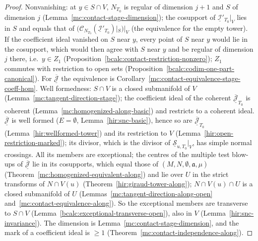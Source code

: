 \begin{proof}
\leanok
Nonvanishing: at \(y\in S\cap V\), \(N_{T_0}\) is regular of dimension \(j+1\) and \(S\) of dimension \(j\) (Lemma~\ref{mc:contact-stage-dimension}); the cosupport of
\(\underline{\mathcal I}'_{T_0}|_V\) lies in \(S\) and equals that of \((\mathcal C_{N_{T_0}}(\underline{\mathcal I}'_{T_0})|_S)|_V\) (the equivalence for the empty tower). If the coefficient ideal
vanished on \(S\) near \(y\), every point of \(S\) near \(y\) would lie in the cosupport, which would then agree with \(S\) near \(y\) and be regular of dimension
\(j\) there, i.e.\ \(y\in Z_1\) (Proposition~\ref{bcalc:contact-restriction-nonzero}); \(Z_1\) commutes with restriction to open sets (Proposition~\ref{bcalc:codim-one-part-canonical}).
For \(\overline{\underline{\mathcal J}}\) the equivalence is Corollary~\ref{mc:contact-equivalence-stage-coeff-hom}.
Well formedness: \(S\cap V\) is a closed submanifold of \(V\) (Lemma~\ref{mc:tangent-direction-stage}); the coefficient ideal of the coherent
\(\overline{\underline{\mathcal J}}_{T_0}\) is coherent (Lemma~\ref{mc:homogenized-along-basic}) and restricts to a coherent ideal. \(\overline{\underline{\mathcal J}}\) is well formed
(\(E=\emptyset\), Lemma~\ref{hir:snc-basic}), hence so are \(\overline{\underline{\mathcal J}}_{T_0}\) (Lemma~\ref{hir:wellformed-tower}) and its restriction to \(V\)
(Lemma~\ref{hir:open-restriction-marked}); its divisor, which is the divisor of \(\underline{\mathcal S}_{u,T_0}|_V\), has simple normal crossings. All its members are
exceptional; the centres of the multiple test blow-ups of \(\overline{\underline{\mathcal J}}\) lie in its cosupports, which equal those of \((M,N,\emptyset,\mathfrak a,\mu)\)
(Theorem~\ref{mc:homogenized-equivalent-along}) and lie over \(U\) in the strict transforms of \(N\cap V(u)\) (Theorem~\ref{hir:giraud-tower-along}); \(N\cap V(u)\cap U\) is a closed
submanifold of \(U\) (Lemmas~\ref{mc:tangent-direction-along-open} and~\ref{mc:contact-equivalence-along}). So the exceptional members are transverse to \(S\cap V\)
(Lemma~\ref{bcalc:exceptional-transverse-open}), also in \(V\) (Lemma~\ref{hir:snc-invariance}). The dimension is Lemma~\ref{mc:contact-stage-dimension}, and the mark of a
coefficient ideal is \(\ge1\) (Theorem~\ref{mc:contact-independence-along}).
\end{proof}

